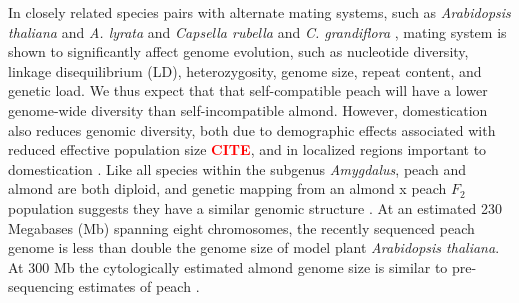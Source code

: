 \documentclass[12pt]{article}
\newcommand{\citex}{\textcolor{red}{\bf CITE}}
\begin{document}
In closely related species pairs with alternate mating systems, such as \emph{Arabidopsis thaliana} and \emph{A. lyrata} and \emph{Capsella rubella} and \emph{C. grandiflora} \citep{slotte2013capsella}, mating system is shown to significantly affect genome evolution, such as nucleotide diversity, linkage disequilibrium (LD), heterozygosity, genome size, repeat content, and genetic load.
%
We thus expect that that self-compatible peach will have a lower genome-wide diversity than self-incompatible almond.
%
However, domestication also reduces genomic diversity, both due to demographic effects associated with reduced effective population size \citex, and in localized regions important to domestication \citep{glemin2006impact, doebley2006molecular}. 
%
%
%
%
Like all species within the subgenus \emph{Amygdalus}, peach and almond are both diploid, and genetic mapping from an almond x peach $F_2$ population suggests they have a similar genomic structure \citep{dirlewanger2004comparative}. 
%
At an estimated 230 Megabases (Mb) spanning eight chromosomes, the recently sequenced peach genome \citep{verde2013high} is less than double the genome size of model plant \emph{Arabidopsis thaliana}. 
%
At 300 Mb the cytologically estimated almond genome size is similar to pre-sequencing estimates of peach \citep{arumuganathan1991nuclear}. 
%
%
\end{document}

